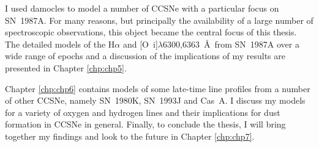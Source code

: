 I used {\sc damocles} to model a number of CCSNe with a particular focus on SN~1987A.  For many reasons, but principally the availability of a large number of spectroscopic observations, this object became the central focus of this thesis. The detailed models of the H$\alpha$ and [O~{\sc i}]$\lambda$6300,6363~\AA\ from SN~1987A over a wide range of epochs and a discussion of the implications of my results are presented in Chapter \ref{chp:chp5}.  

Chapter \ref{chp:chp6} contains models of some late-time line profiles from a number of other CCSNe, namely SN~1980K, SN~1993J and Cas~A.  I discuss my models for a variety of oxygen and hydrogen lines and their implications for dust formation in CCSNe in general.  Finally, to conclude the thesis, I will bring together my findings and look to the future in Chapter \ref{chp:chp7}.


